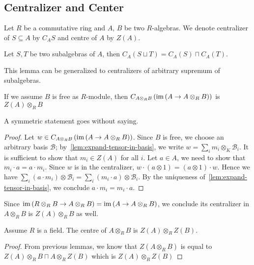 \subsection{Centralizer and Center}
Let $R$ be a commutative ring and $A$, $B$ be two $R$-algebras. We denote centralizer of $S\subseteq A$ by $C_{A}S$ and centre of $A$ by $Z(A)$.

\begin{lemma}
  Let $S, T$ be two subalgebras of $A$, then $C_{A}(S\sqcup T)=C_{A}(S)\sqcap C_{A}(T)$.
  \leanok
\end{lemma}
This lemma can be generalized to centralizers of arbitrary supremum of subalgebras.

\begin{lemma}
  If we assume $B$ is free as $R$-module, then $C_{A\otimes_{R}B}\left(\operatorname{im}\left(A\to A\otimes_{R}B\right)\right)$ is $Z(A) \otimes_{R} B$
\end{lemma}
A symmetric statement goes without saying.
\begin{proof}
  Let $w\in C_{A\otimes_{R}B}\left(\operatorname{im}\left(A\to A\otimes_{R}B\right)\right)$. Since $B$ is free, we choose an arbitrary basis $\mathcal{B}$; by~\cref{lem:expand-tensor-in-basis}, we write $w = \sum_{i}m_{i}\otimes_{K}\mathcal{B}_{i}$. It is sufficient to show that $m_{i}\in Z(A)$ for all $i$. Let $a \in A$, we need to show that $m_{i}\cdot a = a \cdot m_{i}$. Since $w$ is in the centralizer, $w \cdot (a\otimes 1) = (a\otimes 1)\cdot w$. Hence we have $\sum_{i}(a\cdot m_{i})\otimes\mathcal{B}_{i}=\sum_{i}(m_{i}\cdot a)\otimes\mathcal{B}_{i}$. By the uniqueness of~\cref{lem:expand-tensor-in-basis}, we conclude $a\cdot m_{i}=m_{i}\cdot a$.
\end{proof}

\begin{remark}
  Since $\operatorname{im}\left(R\otimes_{R}B\to A\otimes_{R}B\right)=\operatorname{im}\left(A\to A\otimes_{R}B\right)$, we conclude its centralizer in $A\otimes_{R}B$ is $Z(A)\otimes_{R}B$ as well.
\end{remark}

\begin{lemma}
  \label{lem:center-tensor}
  Assume $R$ is a field. The centre of $A\otimes_{R} B$ is $Z\left(A\right)\otimes_{R}Z\left(B\right)$.
  \leanok
\end{lemma}
\begin{proof}
 From previous lemmas, we know that $Z\left(A\otimes_{R}B\right)$ is equal to $Z\left(A\right)\otimes_{R}B \sqcap A\otimes_{R}Z\left(B\right)$ which is $Z\left(A\right)\otimes_{R}Z\left(B\right)$
\end{proof}

